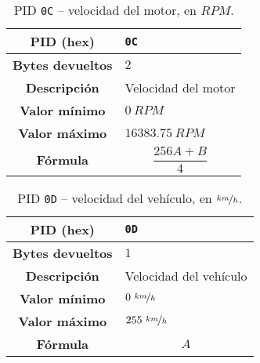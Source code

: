 \begin{table}[H]
  \centering
  \begin{tabularx}{\textwidth}{|c|X|}
    \hline
    \textbf{PID (hex)}       & \texttt{0C}                    \\
    \hline
    \textbf{Bytes devueltos} & $2$                            \\
    \hline
    \textbf{Descripción}     & Velocidad del motor \\
    \hline
    \textbf{Valor mínimo}    & $0~RPM$                          \\
    \hline
    \textbf{Valor máximo}    & $16383.75~RPM$                        \\
    \hline
    \textbf{Fórmula}         &                                %
    \begin{equation*}
      \frac{256A + B}{4}
    \end{equation*}                                 \\
    \hline
  \end{tabularx}
  \caption{\ac{PID} \texttt{0C} -- velocidad del motor, en $RPM$.}
\end{table}

\begin{table}[H]
  \centering
  \begin{tabularx}{\textwidth}{|c|X|}
    \hline
    \textbf{PID (hex)}       & \texttt{0D}                    \\
    \hline
    \textbf{Bytes devueltos} & $1$                            \\
    \hline
    \textbf{Descripción}     & Velocidad del vehículo \\
    \hline
    \textbf{Valor mínimo}    & $0~\nicefrac{km}{h}$                          \\
    \hline
    \textbf{Valor máximo}    & $255~\nicefrac{km}{h}$                        \\
    \hline
    \textbf{Fórmula}         &                                %
    \begin{equation*}
      A
    \end{equation*}                                 \\
    \hline
  \end{tabularx}
  \caption{\ac{PID} \texttt{0D} -- velocidad del vehículo, en $\nicefrac{km}{h}$.}
\end{table}

